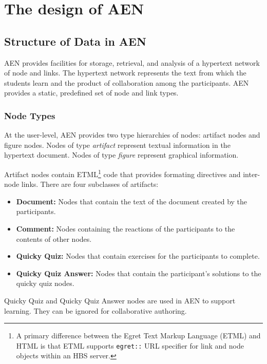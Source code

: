 \section{The design of AEN}
\label{sec:designAEN}
\subsection{Structure of Data in AEN}

AEN provides facilities for storage, retrieval, and analysis of a hypertext
network of node and links. The hypertext network represents the text from
which the students learn and the product of collaboration among the
participants.  AEN provides a static, predefined set of node and link
types.

\subsubsection{Node Types}

At the user-level, AEN provides two type hierarchies of nodes: artifact
nodes and figure nodes.  Nodes of type {\em artifact} represent textual
information in the hypertext document.  Nodes of type {\em figure}
represent graphical information.

Artifact nodes contain ETML\footnote{A primary difference between the Egret
Text Markup Language (ETML) and HTML is that ETML supports {\tt egret::}
URL specifier for link and node objects within an HBS server.} code that
provides formating directives and inter-node links.  There are four
subclasses of artifacts:

\begin{itemize}

\item{\bf Document:} Nodes that contain the text of the document created by
the participants.

\item{\bf Comment:} Nodes containing the reactions of the participants to
the contents of other nodes.

\item{\bf Quicky Quiz:} Nodes that contain exercises for the participants
to complete.

\item{\bf Quicky Quiz Answer:} Nodes that contain the participant's
solutions to the quicky quiz nodes.

\end{itemize}

Quicky Quiz and Quicky Quiz Answer nodes are used in AEN to support
learning.  They can be ignored for collaborative authoring.

